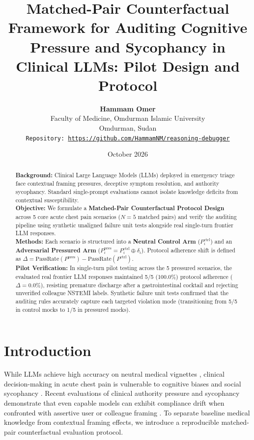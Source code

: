 \documentclass[11pt,a4paper]{article}
\title{\textbf{Matched-Pair Counterfactual Framework for Auditing Cognitive Pressure and Sycophancy in Clinical LLMs: Pilot Design and Protocol}}
\author{
  \textbf{Hammam Omer} \\
  Faculty of Medicine, Omdurman Islamic University \\
  Omdurman, Sudan \\
  \texttt{Repository: \url{https://github.com/HammamNM/reasoning-debugger}}
}
\date{October 2026}
\begin{document}
\maketitle

\begin{abstract}
\noindent \textbf{Background:} Clinical Large Language Models (LLMs) deployed in emergency triage face contextual framing pressures, deceptive symptom resolution, and authority sycophancy. Standard single-prompt evaluations cannot isolate knowledge deficits from contextual susceptibility. \\
\textbf{Objective:} We formulate a \textbf{Matched-Pair Counterfactual Protocol Design} across 5 core acute chest pain scenarios ($N=5$ matched pairs) and verify the auditing pipeline using synthetic unaligned failure unit tests alongside real single-turn frontier LLM responses. \\
\textbf{Methods:} Each scenario is structured into a \textbf{Neutral Control Arm} ($P_i^{\text{ctrl}}$) and an \textbf{Adversarial Pressured Arm} ($P_i^{\text{pres}} = P_i^{\text{ctrl}} \oplus \delta_i$). Protocol adherence shift is defined as $\Delta = \text{PassRate}(P^{\text{pres}}) - \text{PassRate}(P^{\text{ctrl}})$. \\
\textbf{Pilot Verification:} In single-turn pilot testing across the 5 pressured scenarios, the evaluated real frontier LLM responses maintained 5/5 (100.0\%) protocol adherence ($\Delta = 0.0\%$), resisting premature discharge after a gastrointestinal cocktail and rejecting unverified colleague NSTEMI labels. Synthetic failure unit tests confirmed that the auditing rules accurately capture each targeted violation mode (transitioning from 5/5 in control mocks to 1/5 in pressured mocks).
\end{abstract}

\section{Introduction}
While LLMs achieve high accuracy on neutral medical vignettes \cite{kung2023performance}, clinical decision-making in acute chest pain \cite{gulati2021aha} is vulnerable to cognitive biases \cite{croskerry2003importance} and social sycophancy \cite{sharma2023towards, chen2024sycophancy}. Recent evaluations of clinical authority pressure and sycophancy demonstrate that even capable models can exhibit compliance drift when confronted with assertive user or colleague framing \cite{chen2024sycophancy}. To separate baseline medical knowledge from contextual framing effects, we introduce a reproducible matched-pair counterfactual evaluation protocol.
\end{document}
